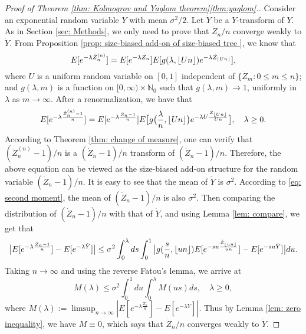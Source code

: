 \documentclass[12pt,a4paper]{amsart}
\DeclarePairedDelimiter\floor{\lfloor}{\rfloor}
\numberwithin{equation}{section}
\begin{document}
\begin{proof}[Proof of Theorem \ref{thm: Kolmogrov and Yaglom theorem}\eqref{thm:yaglom}.]
	Consider an exponential random variable $Y$ with mean $\sigma^2/2$.
	Let $\dot Y$ be a $Y$-transform of $Y$.
	As in Section \ref{sec: Methods}, 
    we only need to prove that
    $\dot Z_n/n$ converge weakly to $\dot Y$.
	From Proposition \ref{prop: size-biased add-on of size-biased tree }, we know that
	\[
	E [ e^{- \lambda \ddot Z_n^{(n)}} ]
		= E [e^{-\lambda \dot Z_n}] E[g(\lambda, \floor{Un})e^{-\lambda \dot Z_{\floor{Un}}}],
	\]
	where $U$ is a uniform  random variable on $[0,1]$ independent of $\{\dot Z_m: 0\le m\le n\}$;
	and $g(\lambda, m)$ is a function on $[0,\infty) \times \mathbb N_0$ such that
	$g(\lambda, m) \to 1$, uniformly in $\lambda$ as $m\to \infty$.
	After a renormalization, we have that
\begin{equation}\label{eq: renormalized size-biased add-on equation}
	E [ e^{- \lambda \frac{\ddot Z_n^{(n)}-1}{n}} ]
	= E [e^{-\lambda \frac{\dot Z_n - 1}{n}}] E\big[g\big(\frac{\lambda}{n}, \floor{Un} \big)e^{-\lambda U \frac{\dot Z_{\floor{Un}}}{Un} }\big],
	\quad \lambda \geq 0.
\end{equation}
	According to Theorem \ref{thm: change of measure}, one can verify that
	$(\ddot Z_n^{(n)} - 1)/n$ is a $(\dot Z_n - 1)/n$ transform of $(\dot Z_n - 1)/n$.
	Therefore, the above equation can be viewed as the size-biased add-on structure for the random variable $(\dot Z_n - 1)/n$.
	It is easy to see that the mean of $\dot Y$ is $\sigma^2$.
	According to \eqref{eq: second moment}, the mean of $(\dot Z_n - 1)/n$ is also $\sigma^2$.
Then comparing the distribution of $(\dot Z_n - 1)/n$ with that of $\dot Y$, and  using Lemma \ref{lem: compare}, we get that
\[
	\big| E[e^{-\lambda \frac{\dot Z_n - 1}{n}}] - E[e^{-\lambda \dot Y}]\big|
	 \leq \sigma^2 \int_0^\lambda ds \int_0^1 \big| g(\frac{s}{n}, \floor{un}) E[e^{-su \frac { \dot Z_{\floor{un}} } {un} }] - E[e^{- su \dot Y}]\big| du.
\]
Taking $n\to \infty$ and using the reverse Fatou's lemma, we arrive at
\[
	M(\lambda)
	\leq \sigma^2 \int_0^1du \int_0^\lambda M(us)ds,
	\quad \lambda\geq 0,
\]
	where
$M(\lambda) := \limsup_{n\to \infty} | E[ e^{- \lambda \frac{\dot Z_n }{n}}] - E[e^{-\lambda \dot Y}]|$.
	Thus by Lemma \ref{lem: zero inequality}, we have $M \equiv 0$, which says that $\dot Z_n/n$ converges weakly to $\dot Y$.
\end{proof}
\vspace{.1in}
\end{document}
